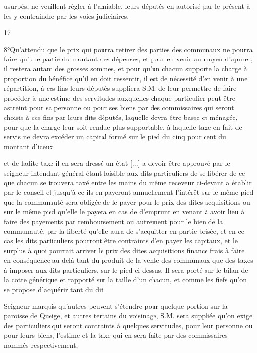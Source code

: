 \documentclass[a4paper,twoside,openany]{article}
\begin{document}
usurpés, ne veuillent régler à l’amiable, leurs députés
en autorisé par le présent à les y contraindre par
les voies judiciaires.
\\
\begin{center}
17
\end{center}
8°Qu’attendu que le prix qui pourra retirer des
parties des communaux ne pourra faire qu’une partie
du montant des dépenses, et pour en venir au moyen
d’apurer, il restera autant des grosses sommes, et pour
qu’un chacun supporte la charge à proportion du bénéfice
qu’il en doit ressentir, il est de nécessité d’en venir à
une répartition, à ces fins leurs députés suppliera
S.M. de leur permettre de faire procéder à
une estime des servitudes auxquelles chaque particulier
peut être astreint pour sa personne ou pour ses
biens par des commissaires qui seront choisis à
ces fins par leurs dits députés, laquelle devra être
basse et ménagée, pour que la charge leur soit
rendue plus supportable, à laquelle taxe en fait
de servis ne devra excéder un capital formé sur le
pied du cinq pour cent du montant d’iceux



et de ladite taxe il en sera dressé un état [...]  
a devoir être approuvé par le seigneur intendant général
étant loisible aux dits particuliers de se libérer de ce que
chacun se trouvera taxé entre les mains du même
receveur ci-devant a établir par le conseil et
jusqu’à ce ils  en payeront annuellement l’intérêt
sur le même pied que la communauté sera obligée
de le payer pour le prix des dites acquisitions ou sur
le même pied qu’elle le payera en cas de d’emprunt
en venant à avoir lieu à faire des payements par
remboursement ou autrement pour le bien de la
communauté, par la liberté qu’elle aura de s’acquitter
en partie brisée, et en ce cas les dits particuliers pourront
être contraints d’en payer les capitaux, et le surplus
à quoi pourrait arriver le prix des dites acquisitions
finance frais à faire en conséquence au-delà tant du
produit de la vente des communaux que des taxes
à imposer aux dits particuliers, sur le pied ci-dessus.
Il sera porté sur le bilan de la cotte générique
et rapporté sur la taille d’un chacun, et comme
les fiefs qu’on se propose d’acquérir tant du dit


Seigneur marquis qu’autres peuvent s’étendre pour
quelque portion sur la paroisse de Queige, et autres
terrains du voisinage, S.M. sera suppliée qu’on
exige des particuliers qui seront contraints à quelques
servitudes, pour leur personne ou pour leurs biens,
l’estime et la taxe qui en sera faite par des commissaires
nommés respectivement,
\end{document}
